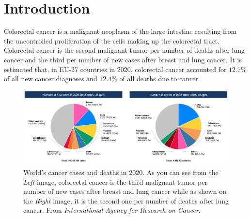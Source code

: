 \documentclass{standalone}
\begin{document}
\chapter*{Introduction}

Colorectal cancer is a malignant neoplasm of the large intestine resulting from the uncontrolled proliferation of the cells making up the colorectal tract.
Colorectal cancer is the second malignant tumor per number of deaths after lung cancer and the third per number of new cases after breast and lung cancer\cite{cancerstats}.
It is estimated that, in EU-27 countries in 2020, colorectal cancer accounted for $12.7 \%$ of all new cancer diagnoses and $12.4\%$ of all deaths due to cancer\cite{eucancerstats}. 
\\

\begin{figure}[!ht]
	\centering
	\includegraphics[width=\linewidth]{../images/cancerstats.png}
	\caption{World's cancer cases and deaths in 2020. As you can see from the \textit{Left} image, colorectal cancer is the third malignant tumor per number of new cases after breast and lung cancer while as shown on the \textit{Right} image, it is the second one per number of deaths after lung cancer. From \textit{International Agency for Research on Cancer}\cite{cancerstats}. }
\end{figure}
\end{document}
